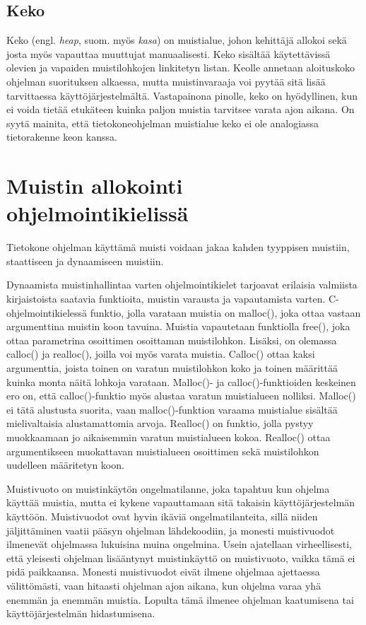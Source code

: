 \subsection{Keko}

Keko (engl. \textit{heap}, suom. myös \textit{kasa}) on muistialue, johon kehittäjä allokoi sekä josta myös vapauttaa muuttujat manuaalisesti. Keko sisältää käytettävissä olevien ja vapaiden muistilohkojen linkitetyn listan. Keolle annetaan aloituskoko ohjelman suorituksen alkaessa, mutta muistinvaraaja voi pyytää sitä lisää tarvittaessa käyttöjärjestelmältä. Vastapainona pinolle, keko on hyödyllinen, kun ei voida tietää etukäteen kuinka paljon muistia tarvitsee varata ajon aikana.\cite{mmic2010} On syytä mainita, että tietokoneohjelman muistialue keko ei ole analogiassa tietorakenne keon kanssa.

\section{Muistin allokointi ohjelmointikielissä}

Tietokone ohjelman käyttämä muisti voidaan jakaa kahden tyyppisen muistiin, staattiseen ja dynaamiseen muistiin.\cite{ddm2015book}

Dynaamista muistinhallintaa varten ohjelmointikielet tarjoavat erilaisia valmiista kirjaistoista saatavia funktioita, muistin varausta ja vapautamista varten. C-ohjelmointikielessä funktio, jolla varataan muistia on malloc(), joka ottaa vastaan argumenttina muistin koon tavuina. Muistia vapautetaan funktiolla free(), joka ottaa parametrina osoittimen osoittaman muistilohkon. Lisäksi, on olemassa calloc() ja realloc(), joilla voi myös varata muistia. Calloc() ottaa kaksi argumenttia, joista toinen on varatun muistilohkon koko ja toinen määrittää kuinka monta näitä lohkoja varataan. Malloc()- ja calloc()-funktioiden keskeinen ero on, että calloc()-funktio myös alustaa varatun muistialueen nolliksi. Malloc() ei tätä alustusta suorita, vaan malloc()-funktion varaama muistialue sisältää mielivaltaisia alustamattomia arvoja. Realloc() on funktio, jolla pystyy muokkaamaan jo aikaisemmin varatun muistialueen kokoa. Realloc() ottaa argumentikseen muokattavan muistialueen osoittimen sekä muistilohkon uudelleen määritetyn koon.\cite{c2015book}

Muistivuoto on muistinkäytön ongelmatilanne, joka tapahtuu kun ohjelma käyttää muistia, mutta ei kykene vapauttamaan sitä takaisin käyttöjärjestelmän käyttöön. Muistivuodot ovat hyvin ikäviä ongelmatilanteita, sillä niiden jäljittäminen vaatii pääsyn ohjelman lähdekoodiin, ja monesti muistivuodot ilmenevät ohjelmassa lukuisina muina ongelmina. Usein ajatellaan virheellisesti, että yleisesti ohjelman lisääntynyt muistinkäyttö on muistivuoto, vaikka tämä ei pidä paikkaansa. Monesti muistivuodot eivät ilmene ohjelmaa ajettaessa välittömästi, vaan hitaasti ohjelman ajon aikana, kun ohjelma varaa yhä enemmän ja enemmän muistia. Lopulta tämä ilmenee ohjelman kaatumisena tai käyttöjärjestelmän hidastumisena.\cite{mmic2010}

